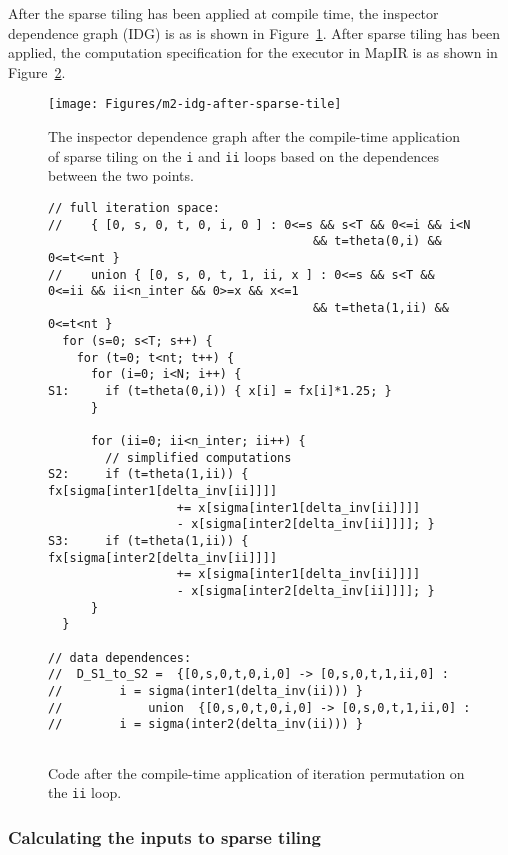 \documentclass{article}
\begin{document}
	
After the sparse tiling has been applied at compile time, the inspector dependence graph (IDG) is as is shown in Figure~\ref{fig:afterST}.
After sparse tiling has been applied, the computation specification for the executor in MapIR is as shown
in Figure~\ref{fig:codeAfterST}.

\begin{figure}[h!]
\texttt{[image: Figures/m2-idg-after-sparse-tile]}
\caption{The inspector dependence graph after the compile-time application of sparse tiling on the
{\tt i} and {\tt ii} loops based on the dependences between the two points.}
\label{fig:afterST}
\end{figure}

\begin{figure}
\begin{verbatim}
// full iteration space:
//    { [0, s, 0, t, 0, i, 0 ] : 0<=s && s<T && 0<=i && i<N 
                                     && t=theta(0,i) && 0<=t<=nt }
//    union { [0, s, 0, t, 1, ii, x ] : 0<=s && s<T && 0<=ii && ii<n_inter && 0>=x && x<=1 
                                     && t=theta(1,ii) && 0<=t<nt }
  for (s=0; s<T; s++) {
    for (t=0; t<nt; t++) {
      for (i=0; i<N; i++) { 
S1:     if (t=theta(0,i)) { x[i] = fx[i]*1.25; }
      }

      for (ii=0; ii<n_inter; ii++) {
        // simplified computations
S2:     if (t=theta(1,ii)) { fx[sigma[inter1[delta_inv[ii]]]] 
                  += x[sigma[inter1[delta_inv[ii]]]] 
                  - x[sigma[inter2[delta_inv[ii]]]]; }
S3:     if (t=theta(1,ii)) { fx[sigma[inter2[delta_inv[ii]]]] 
                  += x[sigma[inter1[delta_inv[ii]]]] 
                  - x[sigma[inter2[delta_inv[ii]]]]; }
      }
  }
  
// data dependences:
//  D_S1_to_S2 =  {[0,s,0,t,0,i,0] -> [0,s,0,t,1,ii,0] : 
//        i = sigma(inter1(delta_inv(ii))) }
//            union  {[0,s,0,t,0,i,0] -> [0,s,0,t,1,ii,0] : 
//        i = sigma(inter2(delta_inv(ii))) }
  
  \end{verbatim}
\caption{Code after the compile-time application of iteration permutation on the
{\tt ii} loop.}
\label{fig:codeAfterST}
\end{figure}

\subsubsection{Calculating the inputs to sparse tiling}
\end{document}
